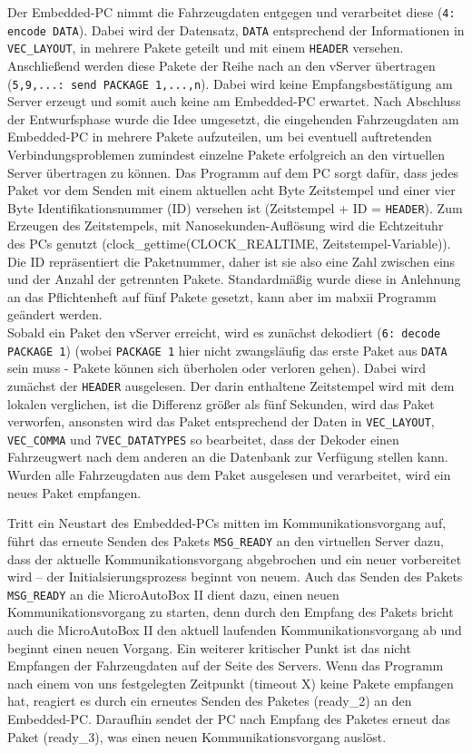 \documentclass[fontsize = 12pt, paper = a4]{scrreprt}
\begin{document}
\begin{itemize}
Der Embedded-PC nimmt die Fahrzeugdaten entgegen und verarbeitet diese (\texttt{4: encode DATA}). Dabei wird der Datensatz, \texttt{DATA} entsprechend der Informationen in \texttt{VEC\_LAYOUT}, in mehrere Pakete geteilt und mit einem \texttt{HEADER} versehen. Anschließend werden diese Pakete der Reihe nach an den vServer übertragen (\texttt{5,9,...: send PACKAGE 1,...,n}). Dabei wird keine Empfangsbestätigung am Server erzeugt und somit auch keine am Embedded-PC erwartet. 
Nach Abschluss der Entwurfsphase wurde die Idee umgesetzt, die eingehenden Fahrzeugdaten am Embedded-PC in mehrere Pakete aufzuteilen, um bei eventuell auftretenden Verbindungsproblemen zumindest einzelne Pakete erfolgreich an den virtuellen Server übertragen zu können. Das Programm auf dem PC sorgt dafür, dass jedes Paket vor dem Senden mit einem aktuellen acht Byte Zeitstempel und einer vier Byte Identifikationsnummer (ID) versehen ist (Zeitstempel + ID = \texttt{HEADER}). Zum Erzeugen des Zeitstempels, mit Nanosekunden-Auflösung wird die Echtzeituhr des PCs genutzt (clock\_gettime(CLOCK\_REALTIME, Zeitstempel-Variable)). Die ID repräsentiert die Paketnummer, daher ist sie also eine Zahl zwischen eins und der Anzahl der getrennten Pakete. Standardmäßig wurde diese in Anlehnung an das Pflichtenheft auf fünf Pakete gesetzt, kann aber im mabxii Programm geändert werden. \\
Sobald ein Paket den vServer erreicht, wird es zunächst dekodiert (\texttt{6: decode PACKAGE 1}) (wobei \texttt{PACKAGE 1} hier nicht zwangsläufig das erste Paket aus \texttt{DATA} sein muss - Pakete können sich überholen oder verloren gehen). Dabei wird zunächst der \texttt{HEADER} ausgelesen. Der darin enthaltene Zeitstempel wird mit dem lokalen verglichen, ist die Differenz größer als fünf Sekunden, wird das Paket verworfen, ansonsten wird das Paket entsprechend der Daten in \texttt{VEC\_LAYOUT}, \texttt{VEC\_COMMA} und 7\texttt{VEC\_DATATYPES} so bearbeitet, dass der Dekoder einen Fahrzeugwert nach dem anderen an die Datenbank zur Verfügung stellen kann. Wurden alle Fahrzeugdaten aus dem Paket ausgelesen und verarbeitet, wird ein neues Paket empfangen. 


\end{itemize}

Tritt ein Neustart des Embedded-PCs mitten im Kommunikationsvorgang auf, führt das erneute Senden des Pakets \texttt{MSG\_READY} an den virtuellen Server dazu, dass der aktuelle Kommunikationsvorgang abgebrochen und ein neuer vorbereitet wird -- der Initialsierungsprozess beginnt von neuem. Auch das Senden des Pakets \texttt{MSG\_READY} an die MicroAutoBox II dient dazu, einen neuen Kommunikationsvorgang zu starten, denn durch den Empfang des Pakets bricht auch die MicroAutoBox II den aktuell laufenden Kommunikationsvorgang ab und beginnt einen neuen Vorgang. Ein weiterer kritischer Punkt ist das nicht Empfangen der Fahrzeugdaten auf der Seite des Servers. Wenn das Programm nach einem von uns festgelegten Zeitpunkt (timeout X) keine Pakete empfangen hat, reagiert es durch ein erneutes Senden des Paketes (ready\_2) an den Embedded-PC. Daraufhin sendet der PC nach Empfang des Paketes erneut das Paket (ready\_3), was einen neuen Kommunikationsvorgang auslöst. 
\end{document}

